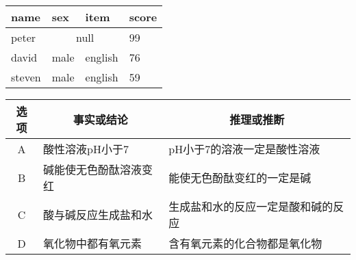 \documentclass[UTF8,fontset=ubuntu]{ctexart}
\begin{document}
\begin{tabular}{l|l|l|l}
    \hline
    name & sex & item & score\\
    \hline
    peter & \multicolumn{2}{c|}{null} & 99\\
    \hline
    david & male & english & 76\\
    \hline
    steven & male & english & 59\\
    \hline
\end{tabular}

\begin{tabular}{|c|l|l|}
\hline
    选项 & \multicolumn{1}{|c|}{事实或结论} & \multicolumn{1}{|c|}{推理或推断}\\
    \hline
    A & 酸性溶液pH小于7 & pH小于7的溶液一定是酸性溶液\\
    \hline
    B & 碱能使无色酚酞溶液变红 & 能使无色酚酞变红的一定是碱\\
    \hline
    C & 酸与碱反应生成盐和水 & 生成盐和水的反应一定是酸和碱的反应\\
    \hline
    D & 氧化物中都有氧元素 & 含有氧元素的化合物都是氧化物\\
    \hline
\end{tabular}
\end{document}
